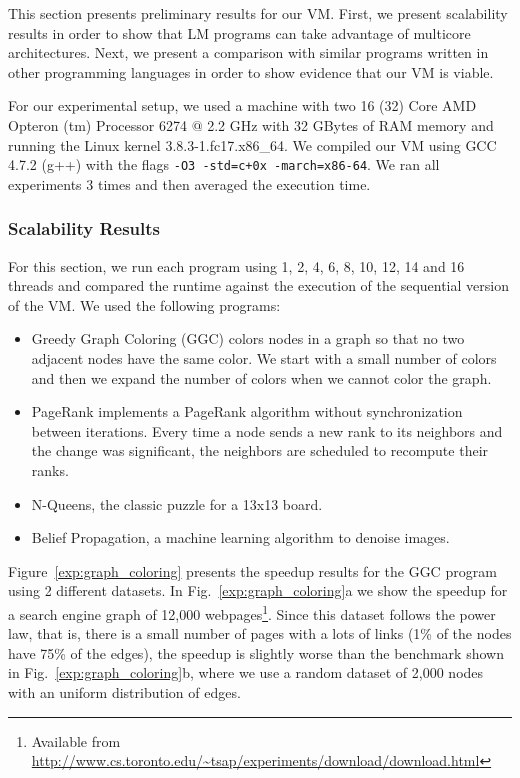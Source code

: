 This section presents preliminary results for our VM.
First, we present scalability results in order to show that LM programs can take advantage of multicore architectures.
Next, we present a comparison with similar programs written in other programming languages
in order to show evidence that our VM is viable.

For our experimental setup, we used a machine 
with two 16 (32) Core AMD Opteron
(tm) Processor 6274 $@$ 2.2 GHz with 32 GBytes of RAM memory and running the Linux
kernel 3.8.3-1.fc17.x86\_64.
     We compiled our VM using GCC 4.7.2 (g++) with the flags \texttt{-O3 -std=c+0x -march=x86-64}.
     We ran all experiments 3 times and then averaged the execution time.
     
\subsubsection{Scalability Results}

For this section, we run each program using 1, 2, 4, 6, 8, 10, 12, 14 and 16 threads and compared the runtime against the execution of the sequential version of the VM. We used the following programs:

\newcommand{\figsize}[0]{6.5cm}
\captionsetup[sub]{              %
       font=scriptsize}

\begin{itemize}
   \item Greedy Graph Coloring (GGC) colors nodes in a graph so that no two adjacent nodes have the same color. We start with a small number of colors and then we expand the number of colors when we cannot color the graph.
   \item PageRank implements a PageRank algorithm without synchronization between iterations. Every time a node sends a new rank to its neighbors and the change was significant, the neighbors are scheduled to recompute their ranks.
   \item N-Queens, the classic puzzle for a 13x13 board.
   \item Belief Propagation, a machine learning algorithm to denoise images.
\end{itemize}

Figure~\ref{exp:graph_coloring} presents the speedup results for the GGC program using 2 different datasets. In Fig.~\ref{exp:graph_coloring}a we show the speedup for a search engine graph of 12,000 webpages\footnote{Available from \url{http://www.cs.toronto.edu/~tsap/experiments/download/download.html}}. Since this dataset follows the power law, that is, there is a small number of pages with a lots of links (1\% of the nodes have 75\% of the edges), the speedup is slightly worse than the benchmark shown in Fig.~\ref{exp:graph_coloring}b, where we use a random dataset of 2,000 nodes with an uniform distribution of edges.

